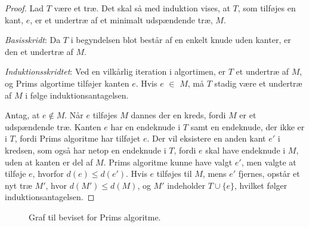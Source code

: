 \begin{proof}
Lad $T$ være et træ. Det skal så med induktion vises, at $T$, som tilføjes en kant, $e$, er et undertræ af et minimalt udspændende træ, $M$. 

\textit{Basisskridt}: Da $T$ i begyndelsen blot består af en enkelt knude uden kanter, er den et undertræ af $M$.

\textit{Induktionsskridtet}: Ved en vilkårlig iteration i algortimen, er $T$ et undertræ af $M$, og Prims algortime tilføjer kanten $e$. Hvis $e$ $\in$ $M$, må $T$ stadig være et undertræ af $M$ i følge induktionsantagelsen.

Antag, at $e \notin M$. Når $e$ tilføjes $M$ dannes der en kreds, fordi $M$ er et udspændende træ.
Kanten $e$ har en endeknude i $T$ samt en endeknude, der ikke er i $T$, fordi Prims algoritme har tilføjet $e$. 
Der vil eksistere en anden kant $e'$ i kredsen, som også har netop en endeknude i $T$, fordi $e$ skal have endeknude i $M$, uden at kanten er del af $M$. 
Prims algoritme kunne have valgt $e'$, men valgte at tilføje $e$, hvorfor $d(e) \leq d(e')$. 
Hvis $e$ tilføjes til $M$, mens $e'$ fjernes, opstår et nyt træ $M'$, hvor 
$d(M') \leq d(M)$, og $M'$ indeholder $T\cup \lbrace e \rbrace$, hvilket følger induktionsantagelsen. 
\end{proof}
\begin{figure}[h]
\centering

\caption{Graf til beviset for Prims algoritme.} 
\label{graf_prim_bevis}
\end{figure}
